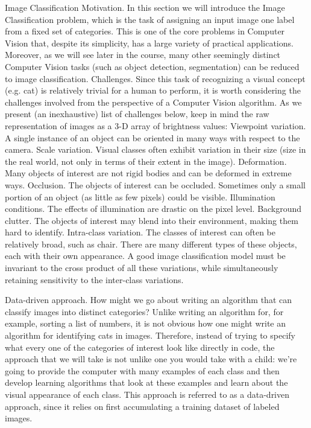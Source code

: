 Image Classification
Motivation. In this section we will introduce the Image Classification problem, which is the task of assigning an input image one label from a fixed set of categories. 
This is one of the core problems in Computer Vision that, despite its simplicity, has a large variety of practical applications. Moreover, as we will see later in the course, 
many other seemingly distinct Computer Vision tasks (such as object detection, segmentation) can be reduced to image classification.
Challenges. 
Since this task of recognizing a visual concept (e.g. cat) is relatively trivial for a human to perform, it is worth considering the challenges involved from the perspective of a 
Computer Vision algorithm. As we present (an inexhaustive) list of challenges below, keep in mind the raw representation of images as a 3-D array of brightness values:
Viewpoint variation. A single instance of an object can be oriented in many ways with respect to the camera.
Scale variation. Visual classes often exhibit variation in their size (size in the real world, not only in terms of their extent in the image).
Deformation. Many objects of interest are not rigid bodies and can be deformed in extreme ways.
Occlusion. The objects of interest can be occluded. Sometimes only a small portion of an object (as little as few pixels) could be visible.
Illumination conditions. The effects of illumination are drastic on the pixel level.
Background clutter. The objects of interest may blend into their environment, making them hard to identify.
Intra-class variation. The classes of interest can often be relatively broad, such as chair. There are many different types of these objects, each with their own appearance.
A good image classification model must be invariant to the cross product of all these variations, while simultaneously retaining sensitivity to the inter-class variations.

Data-driven approach. 
How might we go about writing an algorithm that can classify images into distinct categories? Unlike writing an algorithm for, for example, sorting a list of numbers, 
it is not obvious how one might write an algorithm for identifying cats in images. Therefore, instead of trying to specify what every one of the categories of interest look like directly in code, the approach that we will take is not unlike one you would take with a child: we’re going to provide the computer with many examples of each class and then develop learning algorithms that look at these examples and learn about the visual appearance of each class. 
This approach is referred to as a data-driven approach, since it relies on first accumulating a training dataset of labeled images. 


